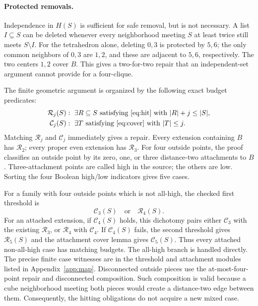 \documentclass[11pt]{article}
\theoremstyle{definition}\newtheorem{definition}[theorem]{Definition}
\theoremstyle{remark}\newtheorem{remark}[theorem]{Remark}
\newcommand{\card}[1]{\lvert #1\rvert}
\begin{document}
\paragraph{Protected removals.}
Independence in $H(S)$ is sufficient for safe removal, but is not necessary. A list $I\subseteq S$ can be deleted whenever every neighborhood meeting $S$ at least twice still meets $S\setminus I$. For the tetrahedron alone, deleting $0,3$ is protected by $5,6$; the only common neighbors of $0,3$ are $1,2$, and these are adjacent to $5,6$, respectively. The two centers $1,2$ cover $B$. This gives a two-for-two repair that an independent-set argument cannot provide for a four-clique.

The finite geometric argument is organized by the following exact budget predicates:
\begin{align*}
 \mathcal R_j(S)&:\ \exists R\subseteq S\text{ satisfying \eqref{eq:hit} with }
                          \card R+j\le\card S,\\
 \mathcal C_j(S)&:\ \exists T\text{ satisfying \eqref{eq:cover} with }\card T\le j.
\end{align*}
Matching $\mathcal R_j$ and $\mathcal C_j$ immediately gives a repair. Every extension containing $B$ has $\mathcal R_2$; every proper even extension has $\mathcal R_3$. For four outside points, the proof classifies an outside point by its zero, one, or three distance-two attachments to $B$. Three-attachment points are called high in the source; the others are low. Sorting the four Boolean high/low indicators gives five cases.

For a family with four outside points which is not all-high, the checked first threshold is
\[
 \mathcal C_3(S)\quad\text{or}\quad\mathcal R_4(S).
\]
For an attached extension, if $\mathcal C_4(S)$ holds, this dichotomy pairs either $\mathcal C_3$ with the existing $\mathcal R_3$, or $\mathcal R_4$ with $\mathcal C_4$. If $\mathcal C_4(S)$ fails, the second threshold gives $\mathcal R_5(S)$ and the attachment cover lemma gives $\mathcal C_5(S)$. Thus every attached non-all-high case has matching budgets. The all-high branch is handled directly. The precise finite case witnesses are in the threshold and attachment modules listed in Appendix~\ref{app:map}. Disconnected outside pieces use the at-most-four-point repair and disconnected composition. Such composition is valid because a cube neighborhood meeting both pieces would create a distance-two edge between them. Consequently, the hitting obligations do not acquire a new mixed case.
\end{document}
